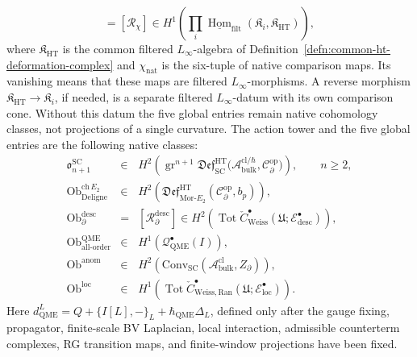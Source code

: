 \begin{defn}
\[    =
    [\mathcal R_{\chi}]
    \in
    H^1\!\left(
    \prod_i
    \underline{\operatorname{Hom}}_{\mathrm{filt}}
    (\mathfrak K_i,\mathfrak K_{\mathrm{HT}})\right),
  \]
  where \(\mathfrak K_{\mathrm{HT}}\) is the common filtered
  \(L_\infty\)-algebra of
  Definition~\ref{defn:common-ht-deformation-complex} and
  \(\chi_{\mathrm{nat}}\) is the six-tuple of native comparison maps.  Its
  vanishing means that these maps are filtered \(L_\infty\)-morphisms.
  A reverse morphism
  \(\mathfrak K_{\mathrm{HT}}\to\mathfrak K_i\), if needed, is a separate
  filtered \(L_\infty\)-datum with its own comparison cone.
  Without this datum the five global entries remain native cohomology
  classes, not projections of a single curvature.
  The action tower and the five global entries are the following native
  classes:
  \[
  \begin{array}{rcl}
	  \mathfrak o^{\mathrm{SC}}_{n+1}
	  &\in&
	  H^2\!\left(
	    \operatorname{gr}^{n+1}
    \mathfrak{Def}^{\mathrm{HT}}_{\mathrm{SC}}
    \bigl(\mathcal A^{\mathrm{cl}/\hbar}_{\mathrm{bulk}},
    \mathcal C^{\mathrm{op}}_\partial\bigr)\right),
  \qquad n\ge2,
  \\[0.35em]
  \operatorname{Ob}^{\mathrm{ch}\,E_2}_{\mathrm{Deligne}}
  &\in&
  H^2\!\left(
  \mathfrak{Def}^{\mathrm{HT}}_{\mathrm{Mor}\mbox{-}E_2}
  (\mathcal C^{\mathrm{op}}_\partial,b_p)\right),
  \\[0.35em]
  \operatorname{Ob}^{\mathrm{desc}}_{\partial}
  &=&
  [\mathcal R^{\mathrm{desc}}_{\partial}]
  \in
  H^2\!\left(
  \operatorname{Tot}\check C^\bullet_{\mathrm{Weiss}}
  (\mathfrak U;\mathcal E^\bullet_{\mathrm{desc}})\right),
  \\[0.35em]
  \operatorname{Ob}^{\mathrm{QME}}_{\mathrm{all\mbox{-}order}}
  &\in&
  H^1\!\left(\mathcal Q^\bullet_{\mathrm{QME}}(I)\right),
  \\[0.35em]
  \operatorname{Ob}^{\mathrm{anom}}
  &\in&
  H^2\!\left(\mathrm{Conv}_{\mathrm{SC}}\!\left(
  \mathcal A^{\mathrm{cl}}_{\mathrm{bulk}},Z_\partial\right)\right),
  \\[0.35em]
  \operatorname{Ob}^{\mathrm{loc}}
  &\in&
  H^1\!\left(
  \operatorname{Tot}\check C^\bullet_{\mathrm{Weiss,Ran}}
  (\mathfrak U;\mathcal E^\bullet_{\mathrm{loc}})\right).
  \end{array}
  \]
	  Here \(d_{\mathrm{QME}}^L=Q+\{I[L],-\}_{L}+\hbar_{\mathrm{QME}}\Delta_L\), defined
	  only after the gauge fixing, propagator, finite-scale BV Laplacian,
	  local interaction, admissible counterterm complexes, RG transition maps,
	  and finite-window projections have been fixed.

\end{defn}
